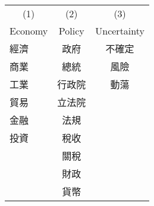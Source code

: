 {
\def\sym#1{\ifmmode^{#1}\else\(^{#1}\)\fi}
\begin{tabular}{l c c}
\hline\hline

\multicolumn{1}{c}{(1)}
&\multicolumn{1}{c}{(2)}
&\multicolumn{1}{c}{(3)}
\\

\multicolumn{1}{c}{Economy}
&\multicolumn{1}{c}{Policy}
&\multicolumn{1}{c}{Uncertainty}
\\
\hline
經濟 & 政府 & 不確定\\
商業 & 總統 & 風險\\
工業 & 行政院 & 動蕩\\
貿易 & 立法院 & \\
金融 & 法規 & \\
投資 & 稅收 & \\
& 關稅 & \\
& 財政 & \\
& 貨幣 & \\
\hline\hline
\end{tabular}
}
